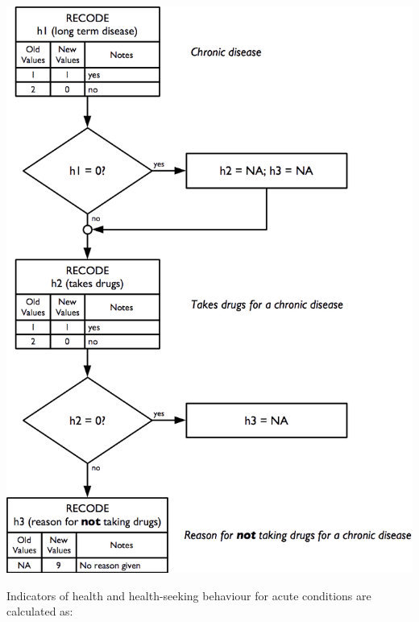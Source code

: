 \documentclass[12pt,a4paper]{book}
\theoremstyle{definition}
\theoremstyle{definition}
\theoremstyle{definition}
\theoremstyle{remark}
\begin{document}
\begin{center}\includegraphics{figures/indicators21} \end{center}

Indicators of health and health-seeking behaviour for acute conditions
are calculated as:
\end{document}

